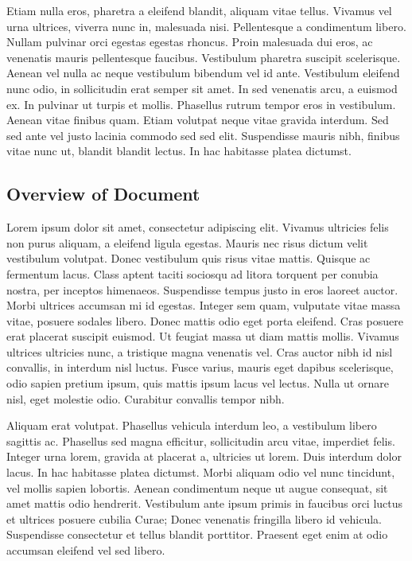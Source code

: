 \documentclass[12pt,letterpaper]{article}
\begin{document}
Etiam nulla eros, pharetra a eleifend blandit, aliquam vitae
tellus. Vivamus vel urna ultrices, viverra nunc in, malesuada nisi.
Pellentesque a condimentum libero. Nullam pulvinar orci egestas egestas
rhoncus. Proin malesuada dui eros, ac venenatis mauris pellentesque
faucibus. Vestibulum pharetra suscipit scelerisque. Aenean vel nulla
ac neque vestibulum bibendum vel id ante. Vestibulum eleifend nunc
odio, in sollicitudin erat semper sit amet. In sed venenatis arcu,
a euismod ex. In pulvinar ut turpis et mollis. Phasellus rutrum tempor
eros in vestibulum. Aenean vitae finibus quam. Etiam volutpat neque
vitae gravida interdum. Sed sed ante vel justo lacinia commodo sed
sed elit. Suspendisse mauris nibh, finibus vitae nunc ut, blandit
blandit lectus. In hac habitasse platea dictumst.


\subsection{Overview of Document}

Lorem ipsum dolor sit amet, consectetur adipiscing elit.
Vivamus ultricies felis non purus aliquam, a eleifend ligula egestas.
Mauris nec risus dictum velit vestibulum volutpat. Donec vestibulum
quis risus vitae mattis. Quisque ac fermentum lacus. Class aptent
taciti sociosqu ad litora torquent per conubia nostra, per inceptos
himenaeos. Suspendisse tempus justo in eros laoreet auctor. Morbi
ultrices accumsan mi id egestas. Integer sem quam, vulputate vitae
massa vitae, posuere sodales libero. Donec mattis odio eget porta
eleifend. Cras posuere erat placerat suscipit euismod. Ut feugiat
massa ut diam mattis mollis. Vivamus ultrices ultricies nunc, a tristique
magna venenatis vel. Cras auctor nibh id nisl convallis, in interdum
nisl luctus. Fusce varius, mauris eget dapibus scelerisque, odio sapien
pretium ipsum, quis mattis ipsum lacus vel lectus. Nulla ut ornare
nisl, eget molestie odio. Curabitur convallis tempor nibh.

Aliquam erat volutpat. Phasellus vehicula interdum leo, a
vestibulum libero sagittis ac. Phasellus sed magna efficitur, sollicitudin
arcu vitae, imperdiet felis. Integer urna lorem, gravida at placerat
a, ultricies ut lorem. Duis interdum dolor lacus. In hac habitasse
platea dictumst. Morbi aliquam odio vel nunc tincidunt, vel mollis
sapien lobortis. Aenean condimentum neque ut augue consequat, sit
amet mattis odio hendrerit. Vestibulum ante ipsum primis in faucibus
orci luctus et ultrices posuere cubilia Curae; Donec venenatis fringilla
libero id vehicula. Suspendisse consectetur et tellus blandit porttitor.
Praesent eget enim at odio accumsan eleifend vel sed libero.
\end{document}
